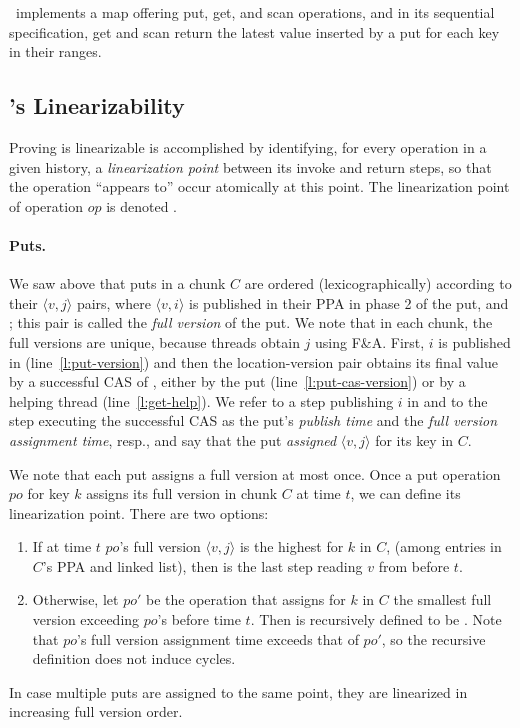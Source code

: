 \kiwi\ implements a map offering put, get, and scan operations, and in its sequential specification, get and scan return the latest value inserted by a put for each key in their ranges.

\subsection{\kiwi's Linearizability}
\label{sec:safe}

Proving {\kiwi} is linearizable is accomplished by identifying, for every operation in a given history, a \emph{linearization point} between its invoke and return steps, so that the operation ``appears to'' occur atomically at this point. 
The linearization point of operation $op$ is denoted . 

\paragraph{Puts.} 

We saw above that puts in a chunk $C$
are ordered (lexicographically) according to their $\langle v, j \rangle$  pairs, where
$\langle v, i \rangle$ is published in their PPA in phase 2 of the put, and ; this pair is called the \emph{full version} of the put.
We note that in each chunk, the full versions are unique, because threads obtain $j$ using F\&A.
First,  $i$ is published in  (line~\ref{l:put-version}) and then
the location-version pair obtains its final value by a successful CAS of , either by the put (line~\ref{l:put-cas-version}) or by a helping thread (line~\ref {l:get-help}). 
We refer to 
a step publishing $i$ in  and to
the step executing the successful CAS  as the put's \emph{publish time} and the \emph{full version assignment time}, resp., 
and say that the put \emph{assigned}  $\langle v, j \rangle$ for its key in $C$.

We note that each put assigns a full version at most once. 
Once a put operation $po$ for key $k$ assigns its full version in chunk $C$ at time $t$, we can define its linearization point. 
There are two options: 
\begin{enumerate}
\setlength{\itemsep}{0pt}
\setlength{\parskip}{0pt}
\item If at time $t$
$po$'s full version $\langle v, j \rangle$ is the highest for $k$ in $C$, (among entries in $C$'s {PPA} and  linked list),
then   is the last step reading $v$ from  before $t$.
\item  Otherwise, let $po'$ be the 
 operation that assigns for $k$ in $C$ the smallest full version exceeding $po$'s
before time $t$. Then  is recursively defined to be . Note that 
$po$'s full version assignment time exceeds that of  $po'$, so the recursive definition does not induce cycles. 
\end{enumerate}
In case multiple puts are assigned to the same point, they are linearized in increasing full version order.


